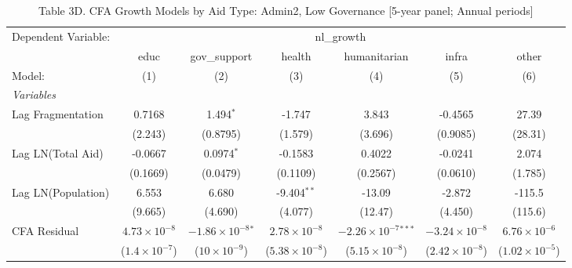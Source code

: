 
\begin{table}[H]
   \caption{Table 3D. CFA Growth Models by Aid Type: Admin2, Low Governance [5-year panel; Annual periods]}
   \centering
   \begin{tabular}{lcccccc}
      \tabularnewline \midrule \midrule
      Dependent Variable: & \multicolumn{6}{c}{nl\_growth}\\
                         & educ                   & gov\_support                 & health                  & humanitarian                   & infra                   & other \\   
      Model:             & (1)                    & (2)                          & (3)                     & (4)                            & (5)                     & (6)\\  
      \midrule
      \emph{Variables}\\
      Lag Fragmentation  & 0.7168                 & 1.494$^{*}$                  & -1.747                  & 3.843                          & -0.4565                 & 27.39\\   
                         & (2.243)                & (0.8795)                     & (1.579)                 & (3.696)                        & (0.9085)                & (28.31)\\   
      Lag LN(Total Aid)  & -0.0667                & 0.0974$^{*}$                 & -0.1583                 & 0.4022                         & -0.0241                 & 2.074\\   
                         & (0.1669)               & (0.0479)                     & (0.1109)                & (0.2567)                       & (0.0610)                & (1.785)\\   
      Lag LN(Population) & 6.553                  & 6.680                        & -9.404$^{**}$           & -13.09                         & -2.872                  & -115.5\\   
                         & (9.665)                & (4.690)                      & (4.077)                 & (12.47)                        & (4.450)                 & (115.6)\\   
      CFA Residual       & $4.73\times 10^{-8}$   & $-1.86\times 10^{-8}$$^{*}$  & $2.78\times 10^{-8}$    & $-2.26\times 10^{-7}$$^{***}$  & $-3.24\times 10^{-8}$   & $6.76\times 10^{-6}$\\    
                         & ($1.4\times 10^{-7}$)  & ($10\times 10^{-9}$)         & ($5.38\times 10^{-8}$)  & ($5.15\times 10^{-8}$)         & ($2.42\times 10^{-8}$)  & ($1.02\times 10^{-5}$)\\    

\end{tabular}
\end{table}
